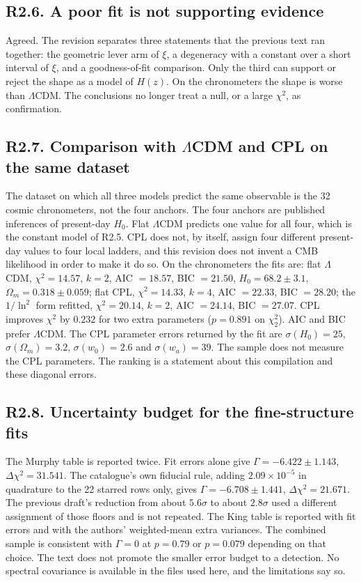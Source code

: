 \documentclass[11pt]{article}
\begin{document}
\subsection*{R2.6. A poor fit is not supporting evidence}

Agreed.
The revision separates three statements that the previous text ran together: the geometric lever arm of $\xi$, a degeneracy with a constant over a short interval of $\xi$, and a goodness-of-fit comparison.
Only the third can support or reject the shape as a model of $H(z)$.
On the chronometers the shape is worse than $\Lambda$CDM.
The conclusions no longer treat a null, or a large $\chi^{2}$, as confirmation.

\subsection*{R2.7. Comparison with $\Lambda$CDM and CPL on the same dataset}

The dataset on which all three models predict the same observable is the 32 cosmic chronometers, not the four anchors.
The four anchors are published inferences of present-day $H_{0}$.
Flat $\Lambda$CDM predicts one value for all four, which is the constant model of R2.5.
CPL does not, by itself, assign four different present-day values to four local ladders, and this revision does not invent a CMB likelihood in order to make it do so.
On the chronometers the fits are:
flat $\Lambda$CDM, $\chi^{2}=14.57$, $k=2$, AIC $=18.57$, BIC $=21.50$, $H_{0}=68.2\pm3.1$, $\Omega_{m}=0.318\pm0.059$;
flat CPL, $\chi^{2}=14.33$, $k=4$, AIC $=22.33$, BIC $=28.20$;
the $1/\ln^{2}$ form refitted, $\chi^{2}=20.14$, $k=2$, AIC $=24.14$, BIC $=27.07$.
CPL improves $\chi^{2}$ by $0.232$ for two extra parameters ($p=0.891$ on $\chi^{2}_{2}$).
AIC and BIC prefer $\Lambda$CDM.
The CPL parameter errors returned by the fit are $\sigma(H_{0})=25$, $\sigma(\Omega_{m})=3.2$, $\sigma(w_{0})=2.6$ and $\sigma(w_{a})=39$.
The sample does not measure the CPL parameters.
The ranking is a statement about this compilation and these diagonal errors.

\subsection*{R2.8. Uncertainty budget for the fine-structure fits}

The Murphy table is reported twice.
Fit errors alone give $\Gamma=-6.422\pm1.143$, $\Delta\chi^{2}=31.541$.
The catalogue's own fiducial rule, adding $2.09\times10^{-5}$ in quadrature to the 22 starred rows only, gives $\Gamma=-6.708\pm1.441$, $\Delta\chi^{2}=21.671$.
The previous draft's reduction from about $5.6\sigma$ to about $2.8\sigma$ used a different assignment of those floors and is not repeated.
The King table is reported with fit errors and with the authors' weighted-mean extra variances.
The combined sample is consistent with $\Gamma=0$ at $p=0.79$ or $p=0.079$ depending on that choice.
The text does not promote the smaller error budget to a detection.
No spectral covariance is available in the files used here, and the limitations say so.
\end{document}
